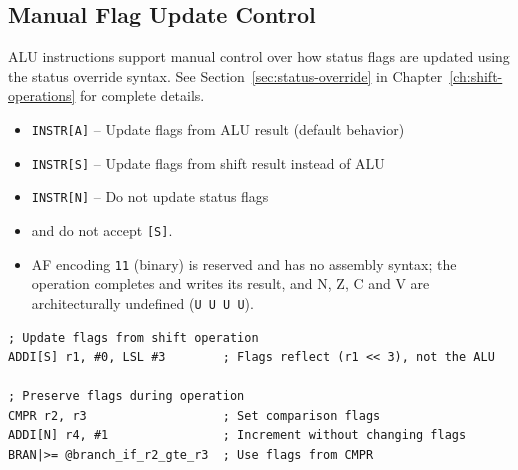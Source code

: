 \subsection{Manual Flag Update Control}

ALU instructions support manual control over how status flags are updated using the status override syntax. See
Section~\ref{sec:status-override} in Chapter~\ref{ch:shift-operations} for complete details.

\begin{itemize}
	\item \texttt{INSTR[A]} -- Update flags from ALU result (default behavior)
	\item \texttt{INSTR[S]} -- Update flags from shift result instead of ALU
	\item \texttt{INSTR[N]} -- Do not update status flags
	\item {} and  do not accept \texttt{[S]}.
	\item AF encoding \texttt{11} (binary) is reserved and has no assembly syntax; the operation completes and writes its result,
	      and N, Z, C and V are architecturally undefined (\texttt{U U U U}).
\end{itemize}

\begin{example}
	\begin{lstlisting}
; Update flags from shift operation
ADDI[S] r1, #0, LSL #3        ; Flags reflect (r1 << 3), not the ALU

; Preserve flags during operation
CMPR r2, r3                   ; Set comparison flags
ADDI[N] r4, #1                ; Increment without changing flags
BRAN|>= @branch_if_r2_gte_r3  ; Use flags from CMPR
	\end{lstlisting}
	\caption{Manual Status Flag Update Control}
\end{example}

